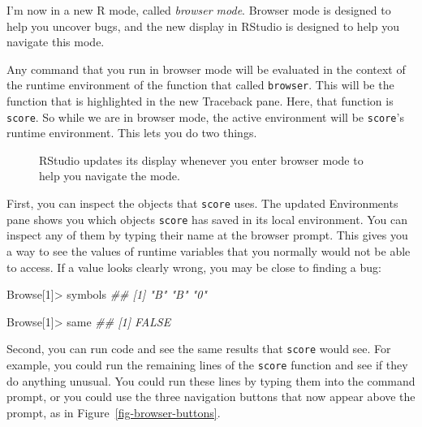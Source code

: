 \documentclass[
  letterpaper,
  DIV=11,
  numbers=noendperiod]{scrbook}
\makeatletter
\newenvironment{Shaded}{\begin{snugshade}}{\end{snugshade}}
\newcommand{\DecValTok}[1]{\textcolor[rgb]{0.68,0.00,0.00}{#1}}
\newcommand{\DocumentationTok}[1]{\textcolor[rgb]{0.37,0.37,0.37}{\textit{#1}}}
\newcommand{\NormalTok}[1]{\textcolor[rgb]{0.00,0.23,0.31}{#1}}
\newcommand{\SpecialCharTok}[1]{\textcolor[rgb]{0.37,0.37,0.37}{#1}}
\newcommand*\pandocbounded[1]{%
  \sbox\pandoc@box{#1}%
  \Gscale@div\@tempa{\textheight}{\dimexpr\ht\pandoc@box+\dp\pandoc@box\relax}%
  \Gscale@div\@tempb{\linewidth}{\wd\pandoc@box}%
  \ifdim\@tempb\p@<\@tempa\p@\let\@tempa\@tempb\fi%
  \ifdim\@tempa\p@<\p@\scalebox{\@tempa}{\usebox\pandoc@box}%
  \else\usebox{\pandoc@box}%
  \fi%
}
\makeatother
\begin{document}
I'm now in a new R mode, called \emph{browser mode}. Browser mode is
designed to help you uncover bugs, and the new display in RStudio is
designed to help you navigate this mode.

Any command that you run in browser mode will be evaluated in the
context of the runtime environment of the function that called
\texttt{browser}. This will be the function that is highlighted in the
new Traceback pane. Here, that function is \texttt{score}. So while we
are in browser mode, the active environment will be \texttt{score}'s
runtime environment. This lets you do two things.

\begin{figure}

\centering{

\pandocbounded{\texttt{[image: images/hopr\_ae03.png]}}

}

\caption{\label{fig-browser}RStudio updates its display whenever you
enter browser mode to help you navigate the mode.}

\end{figure}%

First, you can inspect the objects that \texttt{score} uses. The updated
Environments pane shows you which objects \texttt{score} has saved in
its local environment. You can inspect any of them by typing their name
at the browser prompt. This gives you a way to see the values of runtime
variables that you normally would not be able to access. If a value
looks clearly wrong, you may be close to finding a bug:

\begin{Shaded}
\begin{Highlighting}[]
\NormalTok{Browse[}\DecValTok{1}\NormalTok{]}\SpecialCharTok{\textgreater{}}\NormalTok{ symbols}
\DocumentationTok{\#\# [1] "B" "B" "0"}

\NormalTok{Browse[}\DecValTok{1}\NormalTok{]}\SpecialCharTok{\textgreater{}}\NormalTok{ same}
\DocumentationTok{\#\# [1] FALSE}
\end{Highlighting}
\end{Shaded}

Second, you can run code and see the same results that \texttt{score}
would see. For example, you could run the remaining lines of the
\texttt{score} function and see if they do anything unusual. You could
run these lines by typing them into the command prompt, or you could use
the three navigation buttons that now appear above the prompt, as in
Figure~\ref{fig-browser-buttons}.
\end{document}
